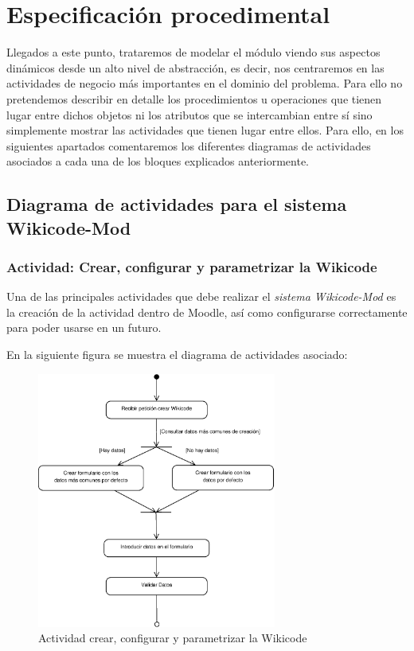 \section{Especificación procedimental}

Llegados a este punto, trataremos de modelar el módulo viendo sus aspectos dinámicos desde un alto nivel de abstracción, es decir, nos centraremos en las actividades de negocio más importantes en el dominio del problema. Para ello no pretendemos describir en detalle los procedimientos u operaciones que tienen lugar entre dichos objetos ni los atributos que se intercambian entre sí sino simplemente mostrar las actividades que tienen lugar entre ellos. Para ello, en los siguientes apartados comentaremos los diferentes diagramas de actividades asociados a cada una de los bloques explicados anteriormente.

\subsection{Diagrama de actividades para el sistema Wikicode-Mod}

\subsubsection{Actividad: Crear, configurar y parametrizar la Wikicode}

Una de las principales actividades que debe realizar el \emph{sistema Wikicode-Mod} es la creación de la actividad dentro de Moodle, así como configurarse correctamente para poder usarse en un futuro.

En la siguiente figura se muestra el diagrama de actividades asociado:

\begin{figure}[h]
	\centering
	\includegraphics[width=0.7\textwidth]{./img/DiagramaA1.eps}
	\caption{Actividad crear, configurar y parametrizar la Wikicode}
\end{figure}

